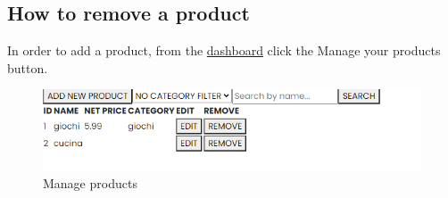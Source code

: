 \subsection{How to remove a product}
In order to add a product, from the \hyperref[_dashboard]{dashboard} click the Manage your products button.
\begin{figure}[H]
    \centering
    \includegraphics[width=\linewidth]{res/images/venditore/manageproducts.png}
    \caption{Manage products}
\end{figure}

